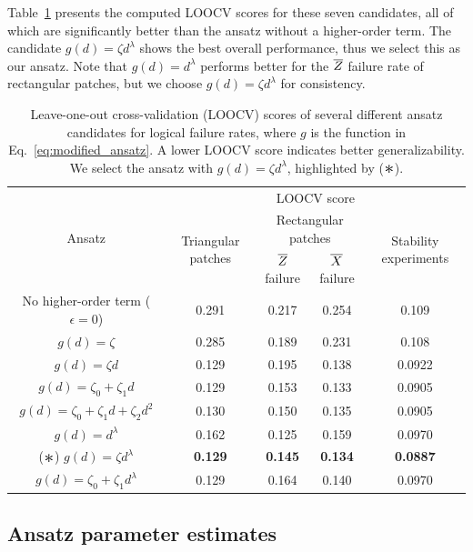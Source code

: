 \documentclass[
 prx,
 reprint,
 superscriptaddress,
 longbibliography,
 dvipsnames
]{revtex4-2}
\begin{document}
Table~\ref{table:ansatz_selection} presents the computed LOOCV scores for these seven candidates, all of which are significantly better than the ansatz without a higher-order term.
The candidate $g(d) = \zeta d^\lambda$ shows the best overall performance, thus we select this as our ansatz.
Note that $g(d) = d^\lambda$ performs better for the $\overline{Z}$ failure rate of rectangular patches, but we choose $g(d) = \zeta d^\lambda$ for consistency.

\begin{table}[t!]
    \centering
    \begin{ruledtabular}
    \begin{tabular}{ccccc}
        \multirow{3}{*}{Ansatz} & \multicolumn{4}{c}{LOOCV score} \\
         & \multirow{2}{*}{Triangular patches} & \multicolumn{2}{c}{Rectangular patches} & \multirow{2}{*}{Stability experiments} \\
         &  & $\overline{Z}$ failure & $\overline{X}$ failure &  \\ \hline
        No higher-order term ($\epsilon = 0$) & 0.291 & 0.217 & 0.254 & 0.109 \\
        $g(d) = \zeta$ & 0.285 & 0.189 & 0.231 & 0.108 \\
        $g(d) = \zeta d$ & 0.129 & 0.195 & 0.138 & 0.0922 \\
        $g(d) = \zeta_0 + \zeta_1 d$ & 0.129 & 0.153 & 0.133 & 0.0905 \\
        $g(d) = \zeta_0 + \zeta_1 d + \zeta_2 d^2$ & 0.130 & 0.150 & 0.135 & 0.0905 \\
        $g(d) = d^\lambda$ & 0.162 & 0.125 & 0.159 & 0.0970 \\
        ($\bigast$) $g(d) = \zeta d^\lambda$ & \textbf{0.129} & \textbf{0.145} & \textbf{0.134} & \textbf{0.0887} \\
        $g(d) = \zeta_0 + \zeta_1 d^\lambda$ & 0.129 & 0.164 & 0.140 & 0.0970
    \end{tabular}
    \end{ruledtabular}
    \caption{
        Leave-one-out cross-validation (LOOCV) scores of several different ansatz candidates for logical failure rates, where $g$ is the function in Eq.~\eqref{eq:modified_ansatz}.
        A lower LOOCV score indicates better generalizability.
        We select the ansatz with $g(d) = \zeta d^\lambda$, highlighted by ($\bigast$).
    }
    \label{table:ansatz_selection}
\end{table}

\subsection{Ansatz parameter estimates \label{subsec:ansatz_parameter_estimates}}
\end{document}
